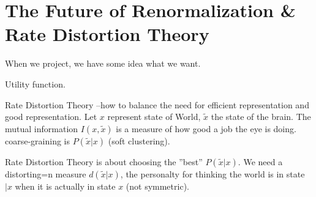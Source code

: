 \documentclass[]{article}
\begin{document}
\section{The Future of Renormalization \& Rate Distortion Theory}

When we project, we have some idea what we want.

Utility function.

Rate Distortion Theory --how to balance the need for efficient representation and good representation. Let ${x}$ represent state of World, ${\tilde{x}}$ the state of the brain. The mutual information $I(x,\tilde{x})$ is a measure of how good a job the eye is doing. coarse-graining is $P(\tilde{x}\vert x)$ (soft clustering).

Rate Distortion Theory is about choosing the ''best'' $P(\tilde{x}\vert x)$. We need a distorting=n measure $d(\tilde{x}\vert x)$, the personalty for thinking the world is in state $\vert x$ when it is actually in state $x$ (not symmetric).

\printglossaries




\end{document}
